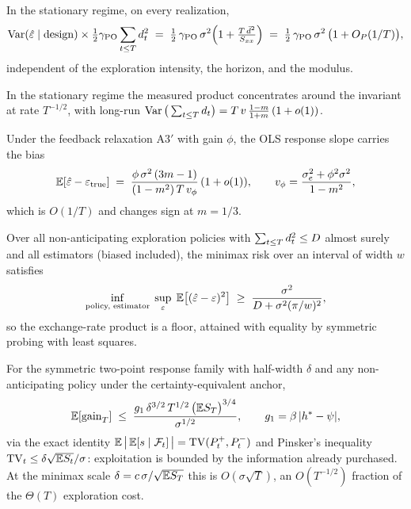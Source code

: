 \documentclass[11pt]{article}
\begin{document}
\begin{theorem}
In the stationary regime, on every realization,
\[
\operatorname{Var}(\hat{\varepsilon} \mid \mathrm{design}) \times \tfrac{1}{2}\gamma_{\mathrm{PO}} \sum_{t\le T}
d_t^2 \;=\; \tfrac{1}{2}\,\gamma_{\mathrm{PO}}\,\sigma^2\Big(1 +
\tfrac{T\,\bar{d}^2}{S_{xx}}\Big)
\;=\; \tfrac{1}{2}\,\gamma_{\mathrm{PO}}\,\sigma^2\,\big(1 + O_P(1/T)\big),
\]
independent of the exploration intensity, the horizon, and the modulus.
\end{theorem}

\begin{proposition}[Concentration; P2.1]
In the stationary regime the measured product concentrates around the
invariant at rate $T^{-1/2}$, with long-run
$\operatorname{Var}\big(\sum_{t\le T}d_t\big) = T\,v\,\tfrac{1-m}{1+m}\,(1+o(1))$.
\end{proposition}

\begin{proposition}
Under the feedback relaxation A3$'$ with gain $\phi$, the OLS response
slope carries the bias
\[
\mathbb{E}[\hat{\varepsilon} - \varepsilon_{\mathrm{true}}] \;=\;
\frac{\phi\,\sigma^2\,(3m-1)}{(1-m^2)\,T\,v_\phi}\,(1+o(1)),
\qquad v_\phi = \frac{\sigma_e^2 + \phi^2\sigma^2}{1-m^2},
\]
which is $O(1/T)$ and changes sign at $m = 1/3$.
\end{proposition}

\begin{theorem}
Over all non-anticipating exploration policies with
$\sum_{t\le T} d_t^2 \le D$ almost surely and all estimators (biased
included), the minimax risk over an interval of width $w$ satisfies
\[
\inf_{\text{policy, estimator}}\;\sup_{\varepsilon}\;
\mathbb{E}\big[(\hat{\varepsilon} - \varepsilon)^2\big] \;\ge\;
\frac{\sigma^2}{D + \sigma^2 (\pi/w)^2},
\]
so the exchange-rate product is a floor, attained with equality by
symmetric probing with least squares.
\end{theorem}

\begin{lemma}
For the symmetric two-point response family with half-width $\delta$ and
any non-anticipating policy under the certainty-equivalent anchor,
\[
\mathbb{E}[\mathrm{gain}_T] \;\le\;
\frac{g_1\,\delta^{3/2}\,T^{1/2}\,\big(\mathbb{E} S_T\big)^{3/4}}{\sigma^{1/2}},
\qquad g_1 = \beta\,|h^{*} - \psi|,
\]
via the exact identity $\mathbb{E}\,\big|\,\mathbb{E}[s\mid\mathcal{F}_t]\,\big|
= \mathrm{TV}(P^+_t, P^-_t)$ and Pinsker's inequality
$\mathrm{TV}_t \le \delta\sqrt{\mathbb{E} S_t}/\sigma$: exploitation is bounded by the
information already purchased. At the minimax scale
$\delta = c\,\sigma/\sqrt{\mathbb{E} S_T}$ this is $O(\sigma\sqrt{T})$, an
$O(T^{-1/2})$ fraction of the $\Theta(T)$ exploration cost.
\end{lemma}
\end{document}
